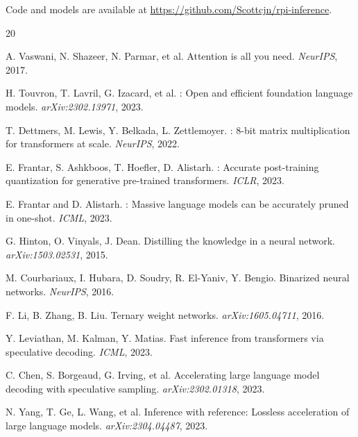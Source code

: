 \documentclass[10pt,twocolumn]{article}
\begin{document}
Code and models are available at \url{https://github.com/Scottcjn/rpi-inference}.


\begin{thebibliography}{20}

A. Vaswani, N. Shazeer, N. Parmar, et al.
\newblock Attention is all you need.
\newblock \emph{NeurIPS}, 2017.

H. Touvron, T. Lavril, G. Izacard, et al.
: Open and efficient foundation language models.
\newblock \emph{arXiv:2302.13971}, 2023.

T. Dettmers, M. Lewis, Y. Belkada, L. Zettlemoyer.
: 8-bit matrix multiplication for transformers at scale.
\newblock \emph{NeurIPS}, 2022.

E. Frantar, S. Ashkboos, T. Hoefler, D. Alistarh.
: Accurate post-training quantization for generative pre-trained transformers.
\newblock \emph{ICLR}, 2023.

E. Frantar and D. Alistarh.
: Massive language models can be accurately pruned in one-shot.
\newblock \emph{ICML}, 2023.

G. Hinton, O. Vinyals, J. Dean.
\newblock Distilling the knowledge in a neural network.
\newblock \emph{arXiv:1503.02531}, 2015.

M. Courbariaux, I. Hubara, D. Soudry, R. El-Yaniv, Y. Bengio.
\newblock Binarized neural networks.
\newblock \emph{NeurIPS}, 2016.

F. Li, B. Zhang, B. Liu.
\newblock Ternary weight networks.
\newblock \emph{arXiv:1605.04711}, 2016.

Y. Leviathan, M. Kalman, Y. Matias.
\newblock Fast inference from transformers via speculative decoding.
\newblock \emph{ICML}, 2023.

C. Chen, S. Borgeaud, G. Irving, et al.
\newblock Accelerating large language model decoding with speculative sampling.
\newblock \emph{arXiv:2302.01318}, 2023.

N. Yang, T. Ge, L. Wang, et al.
\newblock Inference with reference: Lossless acceleration of large language models.
\newblock \emph{arXiv:2304.04487}, 2023.


\end{thebibliography}
\end{document}
